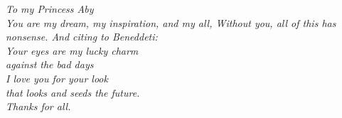 \cleardoublepage


\begin{titlepage}
 \begin{center}
 {\Large\textit{  To my Princess Aby\\ 
You are my dream, my inspiration, and my all,
Without you, all of this has nonsense. And citing to  Beneddeti:\\
Your eyes are my lucky charm\\
against the bad days\\
I love you for your look\\
that looks and seeds the future.\\
Thanks for all. }}
 \end{center}

%		



\end{titlepage}